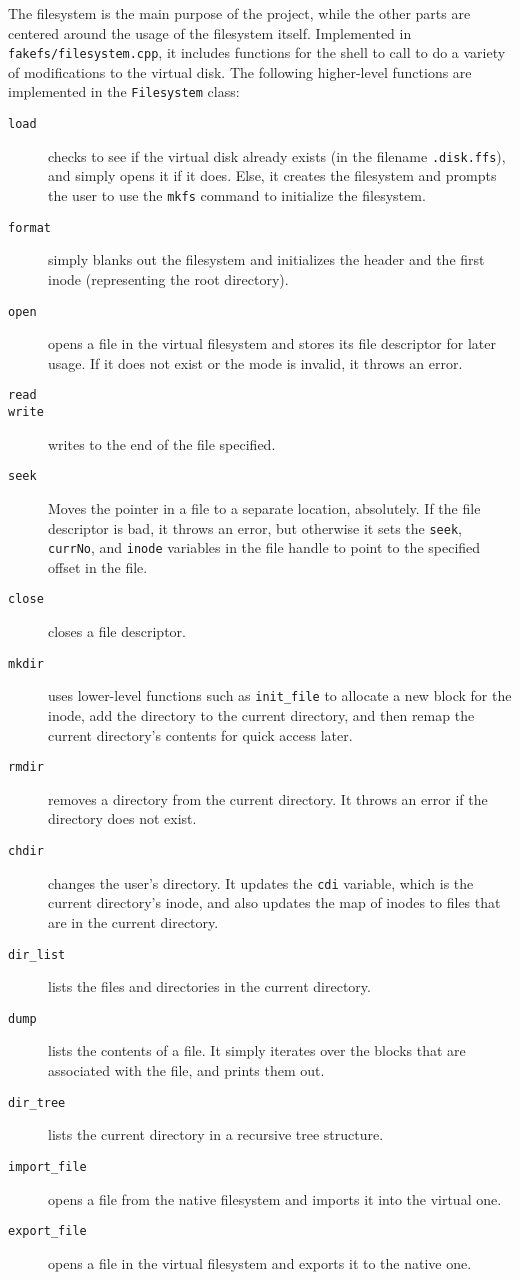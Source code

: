 \documentclass[twoside]{article}
\begin{document}
\begin{multicols}{2}
The filesystem is the main purpose of the project, while the other parts are
centered around the usage of the filesystem itself. Implemented in
\texttt{fakefs/filesystem.cpp}, it includes functions for the shell to call to
do a variety of modifications to the virtual disk. The following higher-level
functions are implemented in the \texttt{Filesystem} class:

\begin{description}
  \item[\texttt{load}] checks to see if the virtual disk already exists (in the
    filename \texttt{.disk.ffs}), and simply opens it if it does. Else, it
    creates the filesystem and prompts the user to use the \texttt{mkfs} command
    to initialize the filesystem.
  \item[\texttt{format}] simply blanks out the filesystem and initializes the
    header and the first inode (representing the root directory).
  \item[\texttt{open}] opens a file in the virtual filesystem and stores its
    file descriptor for later usage. If it does not exist or the mode is
    invalid, it throws an error.
  \item[\texttt{read}] 
  \item[\texttt{write}] writes to the end of the file specified.
  \item[\texttt{seek}] Moves the pointer in a file to a separate location,
    absolutely. If the file descriptor is bad, it throws an error, but otherwise
    it sets the \texttt{seek}, \texttt{currNo}, and \texttt{inode} variables in
    the file handle to point to the specified offset in the file.
  \item[\texttt{close}] closes a file descriptor.
  \item[\texttt{mkdir}] uses lower-level functions such as \texttt{init\_file}
    to allocate a new block for the inode, add the directory to the current
    directory, and then remap the current directory's contents for quick access
    later.
  \item[\texttt{rmdir}] removes a directory from the current directory. It
    throws an error if the directory does not exist.
  \item[\texttt{chdir}] changes the user's directory. It updates the
    \texttt{cdi} variable, which is the current directory's inode, and also
    updates the map of inodes to files that are in the current directory.
  \item[\texttt{dir\_list}] lists the files and directories in the current
    directory.
  \item[\texttt{dump}] lists the contents of a file. It simply iterates over the
    blocks that are associated with the file, and prints them out.
  \item[\texttt{dir\_tree}] lists the current directory in a recursive tree
    structure.
  \item[\texttt{import\_file}] opens a file from the native filesystem and
    imports it into the virtual one.
  \item[\texttt{export\_file}] opens a file in the virtual filesystem and
    exports it to the native one.
\end{description}


\end{multicols}
\end{document}
